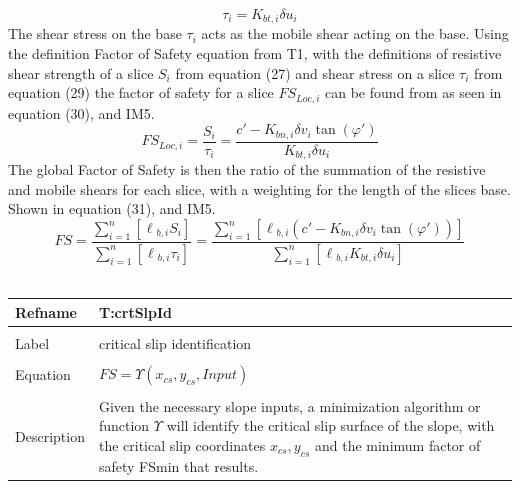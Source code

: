 \documentclass[12pt]{article}
\begin{document}
\begin{equation}
\tau{}_{i}=K_{bt,i}\delta{}u_{i}
\end{equation}
The shear stress on the base $\tau{}_{i}$ acts as the mobile shear acting on the base. Using the definition Factor of Safety equation from T1, with the definitions of resistive shear strength of a slice $S_{i}$ from equation (27) and shear stress on a slice $\tau{}_{i}$ from equation (29) the factor of safety for a slice $FS_{Loc,i}$ can be found from as seen in equation (30), and IM5.
\begin{equation}
FS_{Loc,i}=\frac{S_{i}}{\tau{}_{i}}=\frac{c'-K_{bn,i}\delta{}v_{i}\tan\left(\varphi{}'\right)}{K_{bt,i}\delta{}u_{i}}
\end{equation}
The global Factor of Safety is then the ratio of the summation of the resistive and mobile shears for each slice, with a weighting for the length of the slices base. Shown in equation (31), and IM5.
\begin{equation}
FS=\frac{\displaystyle\sum_{i=1}^{n}{\left[\ell{}_{b,i}S_{i}\right]}}{\displaystyle\sum_{i=1}^{n}{\left[\ell{}_{b,i}\tau{}_{i}\right]}}=\frac{\displaystyle\sum_{i=1}^{n}{\left[\ell{}_{b,i}\left(c'-K_{bn,i}\delta{}v_{i}\tan\left(\varphi{}'\right)\right)\right]}}{\displaystyle\sum_{i=1}^{n}{\left[\ell{}_{b,i}K_{bt,i}\delta{}u_{i}\right]}}
\end{equation}
~\newline
\noindent \begin{minipage}{\textwidth}
\begin{tabular}{p{} p{}}
\toprule \textbf{Refname} & \textbf{T:crtSlpId}
\label{T:crtSlpId}
\\ \midrule \\
Label & critical slip identification
\\ \midrule \\
Equation & $FS=\Upsilon{}\left({x_{cs},y_{cs}},Input\right)$
\\ \midrule \\
Description & Given the necessary slope inputs, a minimization algorithm or function $\Upsilon{}$ will identify the critical slip surface of the slope, with the critical slip coordinates ${x_{cs},y_{cs}}$ and the minimum factor of safety FSmin that results.
\\ \bottomrule \end{tabular}
\end{minipage}\\
\end{document}
